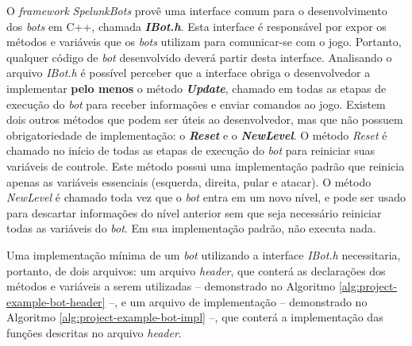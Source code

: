 
O \textit{framework} \textit{SpelunkBots} provê uma interface comum para o
desenvolvimento dos \textit{bots} em C++, chamada \textbf{\textit{IBot.h}}. Esta
interface é responsável por expor os métodos e variáveis que os \textit{bots}
utilizam para comunicar-se com o jogo. Portanto, qualquer código de \textit{bot}
desenvolvido deverá partir desta interface. Analisando o arquivo \textit{IBot.h}
é possível perceber que a interface obriga o desenvolvedor a implementar
\textbf{pelo menos} o método \textbf{\textit{Update}}, chamado em todas as
etapas de execução do \textit{bot} para receber informações e enviar comandos ao
jogo. Existem dois outros métodos que podem ser úteis ao desenvolvedor, mas que
não possuem obrigatoriedade de implementação: o \textbf{\textit{Reset}} e o
\textbf{\textit{NewLevel}}. O método \textit{Reset} é chamado no início de todas
as etapas de execução do \textit{bot} para reiniciar suas variáveis de controle.
Este método possui uma implementação padrão que reinicia apenas as variáveis
essenciais (esquerda, direita, pular e atacar). O método \textit{NewLevel} é
chamado toda vez que o \textit{bot} entra em um novo nível, e pode ser usado
para descartar informações do nível anterior sem que seja necessário reiniciar
todas as variáveis do \textit{bot}. Em sua implementação padrão, não executa
nada.

Uma implementação mínima de um \textit{bot} utilizando a interface
\textit{IBot.h} necessitaria, portanto, de dois arquivos: um arquivo
\textit{header}, que conterá as declarações dos métodos e variáveis a serem
utilizadas -- demonstrado no Algoritmo \ref{alg:project-example-bot-header} --,
e um arquivo de implementação -- demonstrado no Algoritmo
\ref{alg:project-example-bot-impl} --, que conterá a implementação das funções
descritas no arquivo \textit{header}.
